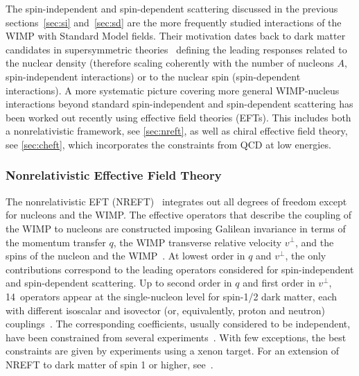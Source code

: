 The spin-independent and spin-dependent scattering discussed in the previous sections~\ref{sec:si} and~\ref{sec:sd} are the more frequently studied interactions of the WIMP with Standard Model fields. Their motivation dates back to dark matter candidates in supersymmetric theories~\cite{Engel:1992bf} defining the leading responses related to the nuclear density (therefore scaling coherently with the number of nucleons $A$, spin-independent interactions) or to the nuclear spin (spin-dependent interactions). A more systematic picture covering more general WIMP-nucleus interactions beyond standard spin-independent and spin-dependent scattering has been worked out recently using effective field theories (EFTs). This includes both a nonrelativistic framework, see \autoref{sec:nreft}, as well as chiral effective field theory, see \autoref{sec:cheft}, which incorporates the constraints from QCD at low energies.

\subsubsection{Nonrelativistic Effective Field Theory}\label{sec:nreft}

The nonrelativistic EFT (NREFT)~\cite{Fan:2010gt,Fitzpatrick:2012ix,Anand:2013yka} integrates out all degrees of freedom except for nucleons and the WIMP. The effective operators that describe the coupling of the WIMP to nucleons are constructed imposing Galilean invariance in terms of the momentum transfer $q$, the WIMP transverse relative velocity $v^\perp$, and the spins of the nucleon and the WIMP~\cite{Fitzpatrick:2012ix,Anand:2013yka}. At lowest order in $q$ and $v^\perp$, the only contributions correspond to the leading operators considered for spin-independent and spin-dependent scattering. Up to second order in $q$ and first order in $v^\perp$, 14~operators appear at the single-nucleon level for spin-1/2 dark matter, each with different isoscalar and isovector (or, equivalently, proton and neutron) couplings~\cite{Anand:2013yka}. The corresponding coefficients, usually considered to be independent, have been constrained from several experiments~\cite{Schneck:2015eqa,Aprile:2017aas,Xia:2018qgs,Angloher:2018fcs}. With few exceptions, the best constraints are given by experiments using a xenon target. For an extension of NREFT to dark matter of spin 1 or higher, see~\cite{Dent:2015zpa,Catena:2019hzw,Gondolo:2020wge}.

